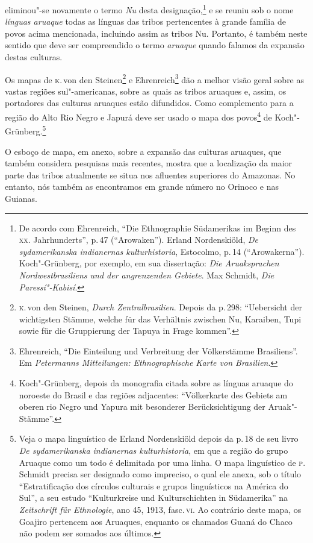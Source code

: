 eliminou"-se novamente o termo \textit{Nu} desta designação,\footnote{De acordo
  com Ehrenreich, ``Die Ethnographie Südamerikas im Beginn des \textsc{xx}.
  Jahrhunderts'', p.\,47 (``Arowaken''). Erland Nordenskiöld,
  \textit{De sydamerikanska indianernas kulturhistoria}, Estocolmo, p.\,14
  (``Arowakerna''). Koch"-Grünberg, por exemplo, em sua dissertação:
  \textit{Die Aruaksprachen Nordwestbrasiliens und der angrenzenden
  Gebiete}. Max Schmidt, \textit{Die Paressí"-Kabisí}.} e se
reuniu sob o nome \textit{línguas aruaque} todas as línguas das tribos
pertencentes à grande família de povos acima mencionada, incluindo assim
as tribos Nu. Portanto, é também neste sentido que deve ser compreendido o
termo \textit{aruaque} quando falamos da expansão destas culturas.

Os mapas de \textsc{k}.\,von den Steinen\footnote{\textsc{k}.\,von den Steinen, \textit{Durch
  Zentralbrasilien}. Depois da p.\,298: ``Uebersicht der wichtigsten
  Stämme, welche für das Verhältnis zwischen Nu, Karaiben, Tupi sowie
  für die Gruppierung der Tapuya in Frage kommen''.} e
Ehrenreich\footnote{Ehrenreich, ``Die Einteilung und Verbreitung der
  Völkerstämme Brasiliens''. Em \textit{Petermanns Mitteilungen:
  Ethnographische Karte von Brasilien}.}
dão a melhor visão geral sobre as vastas regiões sul"-americanas, sobre
as quais as tribos aruaques e, assim, os portadores das culturas aruaques
estão difundidos. Como complemento para a região do Alto Rio Negro e
Japurá deve ser usado o mapa dos povos\footnote{Koch"-Grünberg, depois da
  monografia citada sobre as línguas aruaque do noroeste do Brasil e das
  regiões adjacentes: ``Völkerkarte des Gebiets am oberen rio Negro und
  Yapura mit besonderer Berücksichtigung der Aruak"-Stämme''.} de Koch"-Grünberg.\footnote{Veja o mapa
  linguístico de Erland Nordenskiöld depois da p.\,18 de seu livro
  \textit{De sydamerikanska indianernas kulturhistoria}, em que a região
  do grupo Aruaque como um todo é delimitada por uma linha.
  O mapa linguístico de \textsc{p}.\,Schmidt precisa ser designado como impreciso,
  o qual ele anexa, sob o título ``Estratificação dos círculos
  culturais e grupos linguísticos na América do Sul'', a seu estudo
  ``Kulturkreise und Kulturschichten in Südamerika'' na
  \textit{Zeitschrift für Ethnologie}, ano 45, 1913, fasc.\,\textsc{vi}. Ao
  contrário deste mapa, os Goajiro pertencem aos Aruaques, enquanto os
  chamados Guaná do Chaco não podem ser somados aos últimos.}

O esboço de mapa, em anexo, sobre a expansão das culturas aruaques, que
também considera pesquisas mais recentes, mostra que a localização da
maior parte das tribos atualmente se situa nos afluentes
superiores do Amazonas. No entanto, nós também as encontramos em grande
número no Orinoco e nas Guianas. 

